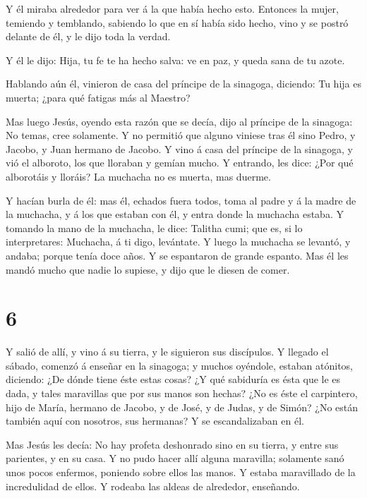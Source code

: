  Y él miraba alrededor para ver á la que había hecho esto.
 Entonces la mujer, temiendo y temblando, sabiendo lo que
en sí había sido hecho, vino y se postró delante de él, y le dijo toda
la verdad.

 Y él le dijo: Hija, tu fe te ha hecho salva: ve en paz, y
queda sana de tu azote.

 Hablando aún él, vinieron de casa del príncipe de la
sinagoga, diciendo: Tu hija es muerta; ¿para qué fatigas más al Maestro?

 Mas luego Jesús, oyendo esta razón que se decía, dijo al
príncipe de la sinagoga: No temas, cree solamente.  Y no
permitió que alguno viniese tras él sino Pedro, y Jacobo, y Juan hermano
de Jacobo.  Y vino á casa del príncipe de la sinagoga, y
vió el alboroto, los que lloraban y gemían mucho.  Y
entrando, les dice: ¿Por qué alborotáis y lloráis? La muchacha no es
muerta, mas duerme.

 Y hacían burla de él: mas él, echados fuera todos, toma al
padre y á la madre de la muchacha, y á los que estaban con él, y entra
donde la muchacha estaba.  Y tomando la mano de la
muchacha, le dice: Talitha cumi; que es, si lo interpretares: Muchacha,
á ti digo, levántate.  Y luego la muchacha se levantó, y
andaba; porque tenía doce años. Y se espantaron de grande espanto.
 Mas él les mandó mucho que nadie lo supiese, y dijo que le
diesen de comer.

\hypertarget{section-5}{%
\section{6}\label{section-5}}

 Y salió de allí, y vino á su tierra, y le siguieron sus
discípulos.  Y llegado el sábado, comenzó á enseñar en la
sinagoga; y muchos oyéndole, estaban atónitos, diciendo: ¿De dónde tiene
éste estas cosas? ¿Y qué sabiduría es ésta que le es dada, y tales
maravillas que por sus manos son hechas?  ¿No es éste el
carpintero, hijo de María, hermano de Jacobo, y de José, y de Judas, y
de Simón? ¿No están también aquí con nosotros, sus hermanas? Y se
escandalizaban en él.

 Mas Jesús les decía: No hay profeta deshonrado sino en su
tierra, y entre sus parientes, y en su casa.  Y no pudo
hacer allí alguna maravilla; solamente sanó unos pocos enfermos,
poniendo sobre ellos las manos.  Y estaba maravillado de la
incredulidad de ellos. Y rodeaba las aldeas de alrededor, enseñando.

